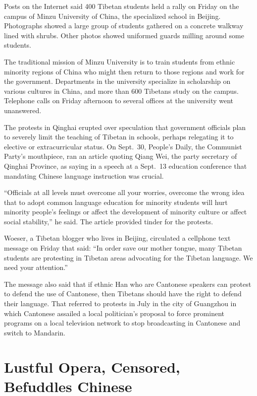 ﻿\documentclass[12pt]{article}
\begin{document}
Posts on the Internet said 400 Tibetan students held a rally on Friday on the campus of Minzu
University of China, the specialized school in Beijing. Photographs showed a large group of students
gathered on a concrete walkway lined with shrubs. Other photos showed uniformed guards milling
around some students.

The traditional mission of Minzu University is to train students from ethnic minority regions of
China who might then return to those regions and work for the government. Departments in the
university specialize in scholarship on various cultures in China, and more than 600 Tibetans study
on the campus. Telephone calls on Friday afternoon to several offices at the university went
unanswered.

The protests in Qinghai erupted over speculation that government officials plan to severely limit
the teaching of Tibetan in schools, perhaps relegating it to elective or extracurricular status. On
Sept.~30, People's Daily, the Communist Party's mouthpiece, ran an article quoting Qiang Wei, the
party secretary of Qinghai Province, as saying in a speech at a Sept.~13 education conference that
mandating Chinese language instruction was crucial.

``Officials at all levels must overcome all your worries, overcome the wrong idea that to adopt
common language education for minority students will hurt minority people's feelings or affect the
development of minority culture or affect social stability,'' he said. The article provided tinder
for the protests.

Woeser, a Tibetan blogger who lives in Beijing, circulated a cellphone text message on Friday that
said: ``In order save our mother tongue, many Tibetan students are protesting in Tibetan areas
advocating for the Tibetan language. We need your attention.''

The message also said that if ethnic Han who are Cantonese speakers can protest to defend the use of
Cantonese, then Tibetans should have the right to defend their language. That referred to protests
in July in the city of Guangzhou in which Cantonese assailed a local politician's proposal to force
prominent programs on a local television network to stop broadcasting in Cantonese and switch to
Mandarin.

\section{Lustful Opera, Censored, Befuddles Chinese}
\end{document}
